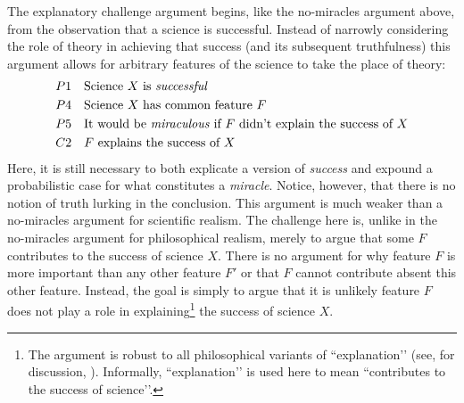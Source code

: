 The explanatory challenge argument begins, like the no-miracles argument above, from the observation that a science is successful. Instead of narrowly considering the role of theory in achieving that success (and its subsequent truthfulness) this argument allows for arbitrary features of the science to take the place of theory:
\begin{align*}
    & P1 \quad \text{Science $X$ is \textit{successful}} \\
    & P4 \quad \text{Science $X$ has common feature $F$} \\
    & P5 \quad \text{It would be \textit{miraculous} if $F$ didn't explain the success of $X$} \\
    & C2 \quad \text{$F$ explains the success of $X$}
\end{align*}
\noindent Here, it is still necessary to both explicate a version of \textit{success} and expound a probabilistic case for what constitutes a \textit{miracle}. Notice, however, that there is no notion of truth lurking in the conclusion. This argument is much weaker than a no-miracles argument for scientific realism. The challenge here is, unlike in the no-miracles argument for philosophical realism, merely to argue that some $F$ contributes to the success of science $X$. There is no argument for why feature $F$ is more important than any other feature $F'$ or that $F$ cannot contribute absent this other feature. Instead, the goal is simply to argue that it is unlikely feature $F$ does not play a role in explaining\footnote{The argument is robust to all philosophical variants of ``explanation’’ (see, for discussion, \cite{woodward2021}). Informally, ``explanation’’ is used here to mean ``contributes to the success of science’’.} the success of science $X$.

